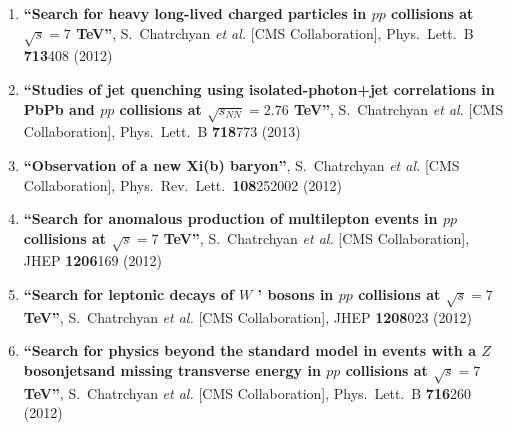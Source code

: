 \begin{enumerate}
\item%
{\bf ``Search for heavy long-lived charged particles in $pp$ collisions at $\sqrt{s}=7$ TeV''}, 
  S.~Chatrchyan {\it et al.}  [CMS Collaboration], 
Phys.\ Lett.\ B {\bf 713}408 (2012) %


\item%
{\bf ``Studies of jet quenching using isolated-photon+jet correlations in PbPb and $pp$ collisions at $\sqrt{s_{NN}}=2.76$ TeV''}, 
  S.~Chatrchyan {\it et al.}  [CMS Collaboration], 
Phys.\ Lett.\ B {\bf 718}773 (2013) %


\item%
{\bf ``Observation of a new Xi(b) baryon''}, 
  S.~Chatrchyan {\it et al.}  [CMS Collaboration], 
Phys.\ Rev.\ Lett.\  {\bf 108}252002 (2012) %


\item%
{\bf ``Search for anomalous production of multilepton events in $pp$ collisions at $\sqrt{s}=7$ TeV''}, 
  S.~Chatrchyan {\it et al.}  [CMS Collaboration], 
JHEP {\bf 1206}169 (2012) %


\item%
{\bf ``Search for leptonic decays of $W$ ' bosons in $pp$ collisions at $\sqrt{s}=7$ TeV''}, 
  S.~Chatrchyan {\it et al.}  [CMS Collaboration], 
JHEP {\bf 1208}023 (2012) %


\item%
{\bf ``Search for physics beyond the standard model in events with a $Z$ bosonjetsand missing transverse energy in $pp$ collisions at $\sqrt{s}=7$ TeV''}, 
  S.~Chatrchyan {\it et al.}  [CMS Collaboration], 
Phys.\ Lett.\ B {\bf 716}260 (2012) %



\end{enumerate}
